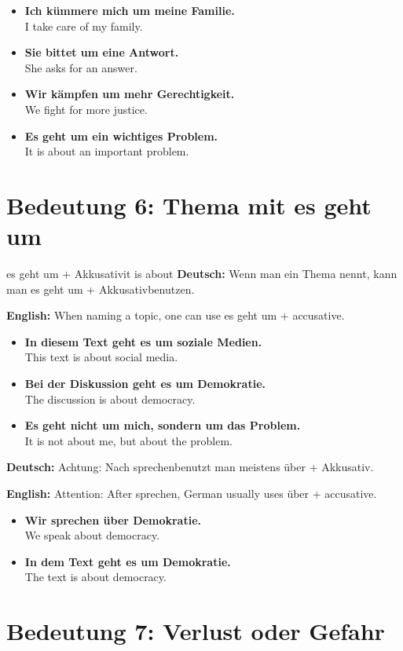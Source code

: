 \documentclass[a4paper,11pt]{article}
\newcommand{\GermanText}[1]{\textbf{Deutsch: }#1\par}
\newcommand{\EnglishText}[1]{{\small\color{SoftGray}\textbf{English: }#1\par}}
\newcommand{\ExampleItem}[2]{\item \textbf{#1}\\{\small\color{SoftGray}#2}}
\begin{document}
\begin{exbox}
\begin{itemize}
    \ExampleItem{Ich kümmere mich um meine Familie.}{I take care of my family.}
    \ExampleItem{Sie bittet um eine Antwort.}{She asks for an answer.}
    \ExampleItem{Wir kämpfen um mehr Gerechtigkeit.}{We fight for more justice.}
    \ExampleItem{Es geht um ein wichtiges Problem.}{It is about an important problem.}
\end{itemize}
\end{exbox}

\section{Bedeutung 6: Thema mit \glqq es geht um\grqq}

\begin{grammarentry}{es geht um + Akkusativ}{it is about}
\GermanText{Wenn man ein Thema nennt, kann man \glqq es geht um + Akkusativ\grqq benutzen.}
\EnglishText{When naming a topic, one can use \glqq es geht um + accusative\grqq.}
\end{grammarentry}

\begin{exbox}
\begin{itemize}
    \ExampleItem{In diesem Text geht es um soziale Medien.}{This text is about social media.}
    \ExampleItem{Bei der Diskussion geht es um Demokratie.}{The discussion is about democracy.}
    \ExampleItem{Es geht nicht um mich, sondern um das Problem.}{It is not about me, but about the problem.}
\end{itemize}
\end{exbox}

\GermanText{Achtung: Nach \glqq sprechen\grqq benutzt man meistens \glqq über + Akkusativ\grqq.}
\EnglishText{Attention: After \glqq sprechen\grqq, German usually uses \glqq über + accusative\grqq.}

\begin{exbox}
\begin{itemize}
    \ExampleItem{Wir sprechen über Demokratie.}{We speak about democracy.}
    \ExampleItem{In dem Text geht es um Demokratie.}{The text is about democracy.}
\end{itemize}
\end{exbox}

\section{Bedeutung 7: Verlust oder Gefahr}
\end{document}
